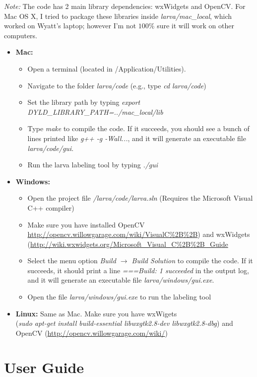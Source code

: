 \documentclass[10pt, onecolumn]{article}
\newcommand{\1}{\textbf{1}}
\begin{document}
\textit{Note:} The code has 2 main library dependencies: wxWidgets and OpenCV.  For Mac OS X, I tried to package these libraries inside \textit{larva/mac\_local}, which worked on Wyatt's laptop; however I'm not $100\%$ sure it will work on other computers.
\begin{itemize}
  \item \textbf{Mac:} \begin{itemize}
    \item Open a terminal (located in /Application/Utilities).  
    \item Navigate to the folder \textit{larva/code}  (e.g., type \textit{cd larva/code})
    \item Set the library path by typing \textit{export DYLD\_LIBRARY\_PATH=../mac\_local/lib}
    \item Type \textit{make} to compile the code.  If it succeeds, you should see a bunch of lines printed like \textit{g++ -g -Wall...}, and it will generate an executable file \textit{larva/code/gui}.
    \item Run the larva labeling tool by typing \textit{./gui}
  \end{itemize}
  \item \textbf{Windows:} \begin{itemize}
    \item Open the project file \textit{/larva/code/larva.sln} (Requires the Microsoft Visual C++ compiler)
    \item Make sure you have installed OpenCV \url{http://opencv.willowgarage.com/wiki/VisualC\%2B\%2B}) and wxWidgets (\url{http://wiki.wxwidgets.org/Microsoft_Visual_C\%2B\%2B_Guide}
    \item Select the menu option \textit{Build $\to$ Build Solution} to compile the code.  If it succeeds, it should print a line \textit{===Build: 1 succeeded} in the output log, and it will generate an executable file \textit{larva/windows/gui.exe}.
    \item Open the file \textit{larva/windows/gui.exe} to run the labeling tool
  \end{itemize}
  \item \textbf{Linux:} Same as Mac.  Make sure you have wxWigets \\(\textit{sudo apt-get install build-essential libwxgtk2.8-dev libwxgtk2.8-dbg}) and OpenCV (\url{http://opencv.willowgarage.com/wiki/})
\end{itemize}

\section{User Guide}
\end{document}

